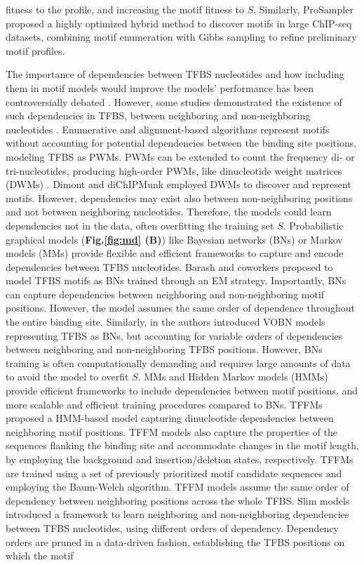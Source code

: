 \documentclass[a4paper, titlepage, openright]{book}
\begin{document}
fitness to the profile, and increasing the motif fitness to $S$. Similarly, ProSampler \citep{li2019prosampler} proposed a highly optimized hybrid method to discover motifs in large ChIP-seq datasets, combining motif enumeration with Gibbs sampling to refine preliminary motif profiles.

The importance of dependencies between TFBS nucleotides and how including them in motif models would improve the models’ performance has been controversially debated \citep{tomovic2007position,morris2011jury,zhao2011quantitative}. However, some studies demonstrated the existence of such dependencies in TFBS, between neighboring and non-neighboring nucleotides \citep{slattery2014absence,rohs2010origins}. Enumerative and alignment-based algorithms represent motifs without accounting for potential dependencies between the binding site positions, modeling TFBS as PWMs. PWMs can be extended to count the frequency di- or tri-nucleotides, producing high-order PWMs, like dinucleotide weight matrices (DWMs) \citep{siddharthan2010dinucleotide}. Dimont \citep{grau2013general} and diChIPMunk \citep{kulakovskiy2013binding} employed DWMs to discover and represent motifs. However, dependencies may exist also between non-neighboring positions and not between neighboring nucleotides. Therefore, the models could learn dependencies not in the data, often overfitting the training set $S$. Probabilistic graphical models (\textbf{Fig.\ref{fig:md} (B)}) like Bayesian networks (BNs) or Markov models (MMs) provide flexible and efficient frameworks to capture and encode dependencies between TFBS nucleotides. Barash and coworkers \citep{barash2003modeling} proposed to model TFBS motifs as BNs trained through an EM strategy. Importantly, BNs can capture dependencies between neighboring and non-neighboring motif positions. However, the model assumes the same order of dependence throughout the entire binding site. Similarly, in \citep{ben2005identification} the authors introduced VOBN models representing TFBS as BNs, but accounting for variable orders of dependencies between neighboring and non-neighboring TFBS positions. However, BNs training is often computationally demanding and requires large amounts of data to avoid the model to overfit $S$. MMs and Hidden Markov models (HMMs) provide efficient frameworks to include dependencies between motif positions, and more scalable and efficient training procedures compared to BNs. TFFMs \citep{mathelier2013next} proposed a HMM-based model capturing dinucleotide dependencies between neighboring motif positions. TFFM models also capture the properties of the sequences flanking the binding site and accommodate changes in the motif length, by employing the background and insertion/deletion states, respectively. TFFMs are trained using a set of previously prioritized motif candidate sequences and employing the Baum-Welch algorithm. TFFM models assume the same order of dependency between neighboring positions across the whole TFBS. Slim models \citep{keilwagen2015varying} introduced a framework to learn neighboring and non-neighboring dependencies between TFBS nucleotides, using different orders of dependency. Dependency orders are pruned in a data-driven fashion, establishing the TFBS positions on which the motif 
\end{document}
